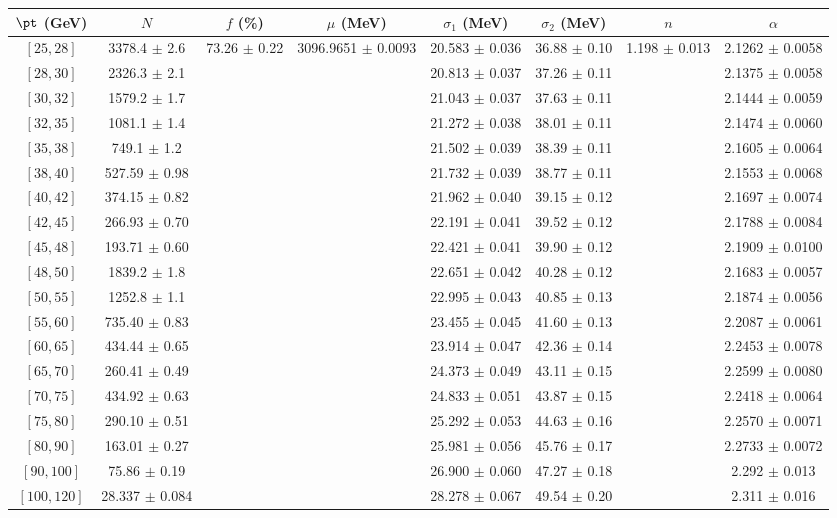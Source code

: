 \begin{tabular}{c||c|c|c|c|c|c|c}
$\pt$ (GeV) & $N$ & $f$ (\%) & $\mu$ (MeV) & $\sigma_1$ (MeV) & $\sigma_2$ (MeV) & $n$ & $\alpha$ \\
\hline
$[25, 28]$ & 3378.4 $\pm$ 2.6 & \multirow{19}{*}{73.26 $\pm$ 0.22} & \multirow{19}{*}{3096.9651 $\pm$ 0.0093} & 20.583 $\pm$ 0.036 & 36.88 $\pm$ 0.10 & \multirow{19}{*}{1.198 $\pm$ 0.013} & 2.1262 $\pm$ 0.0058\\
$[28, 30]$ & 2326.3 $\pm$ 2.1 &  &  & 20.813 $\pm$ 0.037 & 37.26 $\pm$ 0.11 &  & 2.1375 $\pm$ 0.0058\\
$[30, 32]$ & 1579.2 $\pm$ 1.7 &  &  & 21.043 $\pm$ 0.037 & 37.63 $\pm$ 0.11 &  & 2.1444 $\pm$ 0.0059\\
$[32, 35]$ & 1081.1 $\pm$ 1.4 &  &  & 21.272 $\pm$ 0.038 & 38.01 $\pm$ 0.11 &  & 2.1474 $\pm$ 0.0060\\
$[35, 38]$ & 749.1 $\pm$ 1.2 &  &  & 21.502 $\pm$ 0.039 & 38.39 $\pm$ 0.11 &  & 2.1605 $\pm$ 0.0064\\
$[38, 40]$ & 527.59 $\pm$ 0.98 &  &  & 21.732 $\pm$ 0.039 & 38.77 $\pm$ 0.11 &  & 2.1553 $\pm$ 0.0068\\
$[40, 42]$ & 374.15 $\pm$ 0.82 &  &  & 21.962 $\pm$ 0.040 & 39.15 $\pm$ 0.12 &  & 2.1697 $\pm$ 0.0074\\
$[42, 45]$ & 266.93 $\pm$ 0.70 &  &  & 22.191 $\pm$ 0.041 & 39.52 $\pm$ 0.12 &  & 2.1788 $\pm$ 0.0084\\
$[45, 48]$ & 193.71 $\pm$ 0.60 &  &  & 22.421 $\pm$ 0.041 & 39.90 $\pm$ 0.12 &  & 2.1909 $\pm$ 0.0100\\
$[48, 50]$ & 1839.2 $\pm$ 1.8 &  &  & 22.651 $\pm$ 0.042 & 40.28 $\pm$ 0.12 &  & 2.1683 $\pm$ 0.0057\\
$[50, 55]$ & 1252.8 $\pm$ 1.1 &  &  & 22.995 $\pm$ 0.043 & 40.85 $\pm$ 0.13 &  & 2.1874 $\pm$ 0.0056\\
$[55, 60]$ & 735.40 $\pm$ 0.83 &  &  & 23.455 $\pm$ 0.045 & 41.60 $\pm$ 0.13 &  & 2.2087 $\pm$ 0.0061\\
$[60, 65]$ & 434.44 $\pm$ 0.65 &  &  & 23.914 $\pm$ 0.047 & 42.36 $\pm$ 0.14 &  & 2.2453 $\pm$ 0.0078\\
$[65, 70]$ & 260.41 $\pm$ 0.49 &  &  & 24.373 $\pm$ 0.049 & 43.11 $\pm$ 0.15 &  & 2.2599 $\pm$ 0.0080\\
$[70, 75]$ & 434.92 $\pm$ 0.63 &  &  & 24.833 $\pm$ 0.051 & 43.87 $\pm$ 0.15 &  & 2.2418 $\pm$ 0.0064\\
$[75, 80]$ & 290.10 $\pm$ 0.51 &  &  & 25.292 $\pm$ 0.053 & 44.63 $\pm$ 0.16 &  & 2.2570 $\pm$ 0.0071\\
$[80, 90]$ & 163.01 $\pm$ 0.27 &  &  & 25.981 $\pm$ 0.056 & 45.76 $\pm$ 0.17 &  & 2.2733 $\pm$ 0.0072\\
$[90, 100]$ & 75.86 $\pm$ 0.19 &  &  & 26.900 $\pm$ 0.060 & 47.27 $\pm$ 0.18 &  & 2.292 $\pm$ 0.013\\
$[100, 120]$ & 28.337 $\pm$ 0.084 &  &  & 28.278 $\pm$ 0.067 & 49.54 $\pm$ 0.20 &  & 2.311 $\pm$ 0.016\\
\end{tabular}
